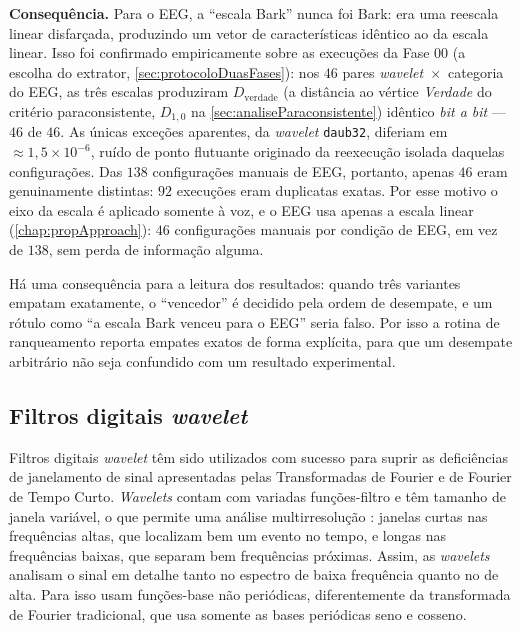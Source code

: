 			\par \textbf{Consequência.} Para o EEG, a ``escala Bark'' nunca foi Bark: era uma reescala linear disfarçada, produzindo um vetor de características idêntico ao da escala linear. Isso foi confirmado empiricamente sobre as execuções da Fase 00 (a escolha do extrator, \autoref{sec:protocoloDuasFases}): nos $46$ pares \textit{wavelet}~$\times$~categoria do EEG, as três escalas produziram $D_{\text{verdade}}$ (a distância ao vértice \textit{Verdade} do critério paraconsistente, $D_{1,0}$ na \autoref{sec:analiseParaconsistente}) idêntico \emph{bit a bit} --- $46$ de $46$. As únicas exceções aparentes, da \textit{wavelet} \texttt{daub32}, diferiam em $\approx\!1{,}5\times10^{-6}$, ruído de ponto flutuante originado da reexecução isolada daquelas configurações. Das $138$ configurações manuais de EEG, portanto, apenas $46$ eram genuinamente distintas: $92$ execuções eram duplicatas exatas. Por esse motivo o eixo da escala é aplicado somente à voz, e o EEG usa apenas a escala linear (\autoref{chap:propApproach}): $46$ configurações manuais por condição de \ac{EEG}, em vez de $138$, sem perda de informação alguma.

			\par Há uma consequência para a leitura dos resultados: quando três variantes empatam exatamente, o ``vencedor'' é decidido pela ordem de desempate, e um rótulo como ``a escala Bark venceu para o EEG'' seria falso. Por isso a rotina de ranqueamento reporta empates exatos de forma explícita, para que um desempate arbitrário não seja confundido com um resultado experimental.

		\subsection{Filtros digitais \textit{wavelet}}
			\par Filtros digitais \textit{wavelet} têm sido utilizados com sucesso para suprir as deficiências de janelamento de sinal apresentadas pelas Transformadas de Fourier e de Fourier de Tempo Curto. \textit{Wavelets} contam com variadas funções-filtro e têm tamanho de janela variável, o que permite uma análise multirresolução \cite{Rod5254905}: janelas curtas nas frequências altas, que localizam bem um evento no tempo, e longas nas frequências baixas, que separam bem frequências próximas. Assim, as \textit{wavelets} analisam o sinal em detalhe tanto no espectro de baixa frequência quanto no de alta. Para isso usam funções-base não periódicas, diferentemente da transformada de Fourier tradicional, que usa somente as bases periódicas seno e cosseno.
			
